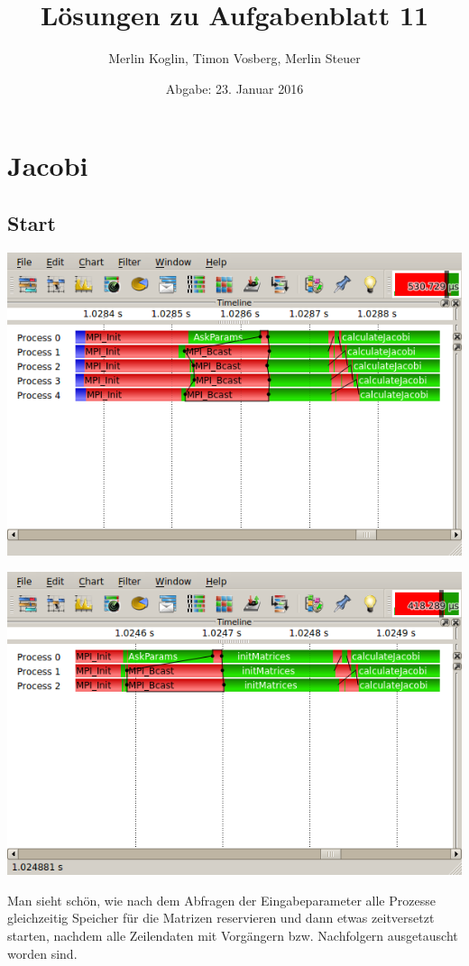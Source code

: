\documentclass[a4paper]{article}
\author{Merlin Koglin, Timon Vosberg, Merlin Steuer}
\date{Abgabe: 23. Januar 2016}
\title{Lösungen zu Aufgabenblatt 11}
\begin{document}
\maketitle
\tableofcontents

\newpage

\section{Jacobi}
\subsection{Start}
\includegraphics[scale=0.9]{img/ja_5_4_start.png}

\includegraphics[scale=0.9]{img/ja_3_2_start.png}

Man sieht schön, wie nach dem Abfragen der Eingabeparameter alle Prozesse gleichzeitig Speicher für die Matrizen reservieren und dann etwas zeitversetzt starten, nachdem alle Zeilendaten mit Vorgängern bzw. Nachfolgern ausgetauscht worden sind.
\end{document}
